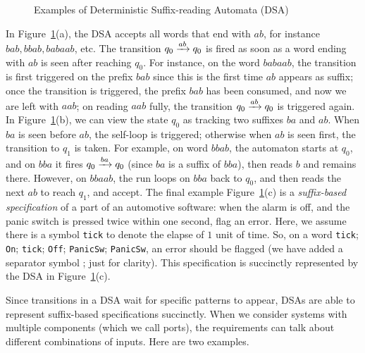 \begin{figure}
  \caption{Examples of Deterministic Suffix-reading Automata (DSA)}
  \label{fig:dsa-examples}
  \end{figure}

  In Figure~\ref{fig:dsa-examples}(a), the DSA accepts all words that end with $ab$, for instance $bab, bbab, babaab$, etc. The transition $q_0 \xrightarrow{ab} q_0$ is fired as soon as a word ending with $ab$ is seen after reaching $q_0$. For instance, on the word $babaab$, the transition is first triggered on the prefix $bab$ since this is the first time $ab$ appears as suffix; once the transition is triggered, the prefix $bab$ has been consumed, and now we are left with $aab$; on reading $aab$ fully, the transition $q_0 \xrightarrow{ab} q_0$ is triggered again.  In Figure~\ref{fig:dsa-examples}(b), we can view the state $q_0$ as tracking two suffixes $ba$ and $ab$. When $ba$ is seen before $ab$, the self-loop is triggered; otherwise when $ab$ is seen first, the transition to $q_1$ is taken. For example, on word $bbab$, the automaton starts at $q_0$, and on $bba$ it fires $q_0 \xrightarrow{ba} q_0$ (since $ba$ is a suffix of $bba$), then reads $b$ and remains there. %
  However, on $bbaab$, the run loops on $bba$ back to $q_0$, and then reads the next $ab$ to reach $q_1$, and accept. The final example Figure~\ref{fig:dsa-examples}(c) is a \emph{suffix-based specification} of a part of an automotive software: when the alarm is off, and the panic switch is pressed twice within one second, flag an error. Here, we assume there is a symbol \texttt{tick} to denote the elapse of $1$ unit of time. So, on a word \texttt{tick}; \texttt{On}; \texttt{tick}; \texttt{Off}; \texttt{PanicSw}; \texttt{PanicSw}, an error should be flagged (we have added a separator symbol ; just for clarity). This specification is succinctly represented by the DSA in Figure~\ref{fig:dsa-examples}(c).

   Since transitions in a DSA wait for specific patterns to appear, DSAs are able to represent suffix-based specifications succinctly. When we consider systems with multiple components (which we call ports), the requirements can talk about different combinations of inputs. Here are two examples. 

